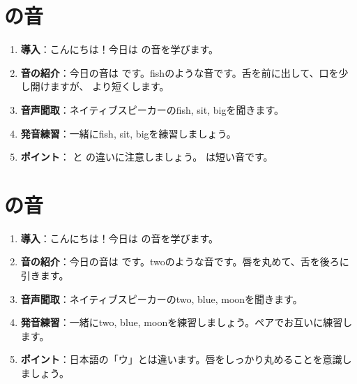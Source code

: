 \documentclass[book,jafontscale=0.9247]{jlreq}
\begin{document}
\section{\textipa{/\textsci /} の音}
\begin{enumerate}
    \item \textbf{導入}：こんにちは！今日は  の音を学びます。
    \item \textbf{音の紹介}：今日の音は \textipa{/\textsci /} です。fishのような音です。舌を前に出して、口を少し開けますが、 より短くします。
    \item \textbf{音声聞取}：ネイティブスピーカーのfish, sit, bigを聞きます。
    \item \textbf{発音練習}：一緒にfish, sit, bigを練習しましょう。
    \item \textbf{ポイント}： と  の違いに注意しましょう。  は短い音です。
\end{enumerate}

\section{ の音}
\begin{enumerate}
    \item \textbf{導入}：こんにちは！今日は  の音を学びます。
    \item \textbf{音の紹介}：今日の音は  です。twoのような音です。唇を丸めて、舌を後ろに引きます。
    \item \textbf{音声聞取}：ネイティブスピーカーのtwo, blue, moonを聞きます。
    \item \textbf{発音練習}：一緒にtwo, blue, moonを練習しましょう。ペアでお互いに練習します。
    \item \textbf{ポイント}：日本語の「ウ」とは違います。唇をしっかり丸めることを意識しましょう。
\end{enumerate}
\end{document}
